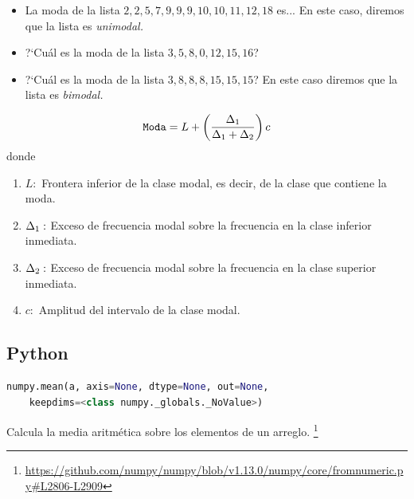 \begin{ejemplo}
	\begin{itemize}
		\item La moda de la lista $2,2,5,7,9,9,9,10,10,11,12,18$ es...  En este caso, diremos que la lista es \emph{unimodal.}
		\item ?`Cuál es la moda de la lista $3,5,8,0,12,15,16$? 
		\item ?`Cuál es la moda de la lista $3,8,8,8,15,15,15$?  En este caso diremos que la lista es \emph{bimodal.}
	\end{itemize}
	
\end{ejemplo}



\begin{definicion}
	\begin{align}
		\texttt{Moda}=
		L + \left( \dfrac{\Delta_{1}}{\Delta_{1}+\Delta_{2}} \right)c
	\end{align}
	donde 
	\begin{enumerate}
		\item $L:$ Frontera inferior de la clase modal, es decir, de la clase que contiene la moda.
		\item $\Delta_{1}:$ Exceso de frecuencia modal sobre la frecuencia en la clase inferior inmediata. 
		\item $\Delta_{2}:$ Exceso de frecuencia modal sobre la frecuencia en la clase superior inmediata. 
		\item $c:$ Amplitud del intervalo de la clase modal.
	\end{enumerate}
	
\end{definicion}



\subsection{Python}

\begin{lstlisting}[language=Python]
	numpy.mean(a, axis=None, dtype=None, out=None,
	keepdims=<class numpy._globals._NoValue>)
\end{lstlisting}

Calcula  la media aritmética sobre los elementos de un arreglo. \footnote{\href{https://github.com/numpy/numpy/blob/v1.13.0/numpy/core/fromnumeric.py\#L2806-L2909}{https://github.com/numpy/numpy/blob/v1.13.0/numpy/core/fromnumeric.py\#L2806-L2909}}


